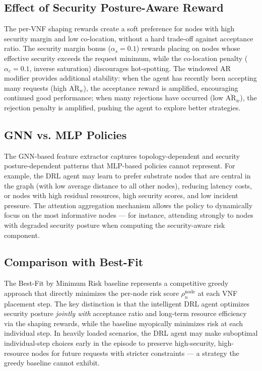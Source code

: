 \subsection{Effect of Security Posture-Aware Reward}

The per-VNF shaping rewards create a soft preference for nodes with high security margin and low co-location, without a hard trade-off against acceptance ratio. The security margin bonus ($\alpha_s = 0.1$) rewards placing on nodes whose effective security exceeds the request minimum, while the co-location penalty ($\alpha_c = 0.1$, inverse saturation) discourages hot-spotting. The windowed AR modifier provides additional stability: when the agent has recently been accepting many requests (high $\overline{\text{AR}}_w$), the acceptance reward is amplified, encouraging continued good performance; when many rejections have occurred (low $\overline{\text{AR}}_w$), the rejection penalty is amplified, pushing the agent to explore better strategies.

\subsection{GNN vs. MLP Policies}

The GNN-based feature extractor captures topology-dependent and security posture-dependent patterns that MLP-based policies cannot represent. For example, the DRL agent may learn to prefer substrate nodes that are central in the graph (with low average distance to all other nodes), reducing latency costs, or nodes with high residual resources, high security scores, and low incident pressure. The attention aggregation mechanism allows the policy to dynamically focus on the most informative nodes — for instance, attending strongly to nodes with degraded security posture when computing the security-aware risk component.

\subsection{Comparison with Best-Fit}

The Best-Fit by Minimum Risk baseline represents a competitive greedy approach that directly minimizes the per-node risk score $\rho_n^{\text{node}}$ at each VNF placement step. The key distinction is that the intelligent DRL agent optimizes security posture \textit{jointly with} acceptance ratio and long-term resource efficiency via the shaping rewards, while the baseline myopically minimizes risk at each individual step. In heavily loaded scenarios, the DRL agent may make suboptimal individual-step choices early in the episode to preserve high-security, high-resource nodes for future requests with stricter constraints — a strategy the greedy baseline cannot exhibit.

